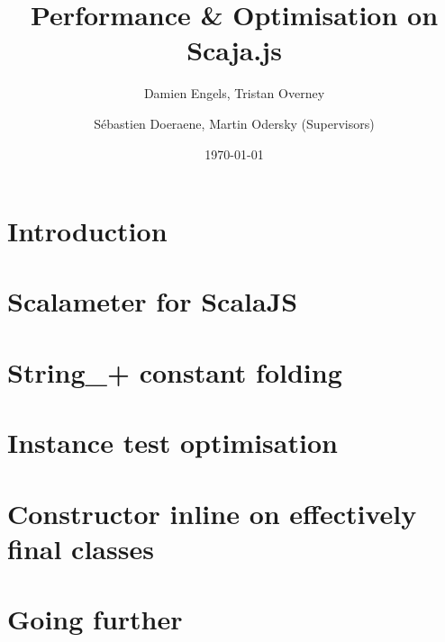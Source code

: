 \documentclass{article}
\begin{document}
\title{Performance \& Optimisation on Scaja.js}
\author{Damien Engels, Tristan Overney\and S\'{e}bastien Doeraene, Martin Odersky (Supervisors)}
\date{\today}
\maketitle

\nocite{*}

\section{Introduction}


\section{Scalameter for ScalaJS}


\section{String\_+ constant folding}


\section{Instance test optimisation}


\section{Constructor inline on effectively final classes}


\section{Going further}


{}

\end{document}
